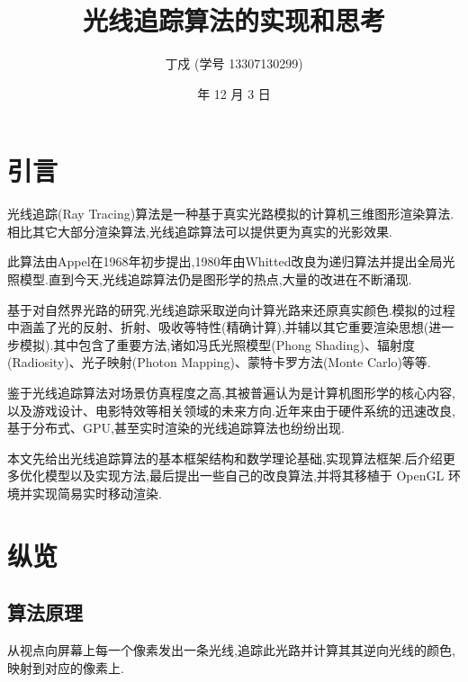 \documentclass[10pt,twocolumn]{article}
\begin{document}
\title{\hei 光线追踪算法的实现和思考}
\author{\fs 丁戍 \small{\fs (学号 13307130299)}}
\date{\small {} 年 12 月 3 日}

\section{\hei 引言}
光线追踪(Ray Tracing)算法是一种基于真实光路模拟的计算机三维图形渲染算法.相比其它大部分渲染算法,光线追踪算法可以提供更为真实的光影效果.

此算法由Appel在1968年初步提出,1980年由Whitted改良为递归算法并提出全局光照模型.直到今天,光线追踪算法仍是图形学的热点,大量的改进在不断涌现.

基于对自然界光路的研究,光线追踪采取逆向计算光路来还原真实颜色.模拟的过程中涵盖了光的反射、折射、吸收等特性(精确计算),并辅以其它重要渲染思想(进一步模拟).其中包含了重要方法,诸如冯氏光照模型(Phong Shading)、辐射度(Radiosity)、光子映射(Photon Mapping)、蒙特卡罗方法(Monte Carlo)等等.

鉴于光线追踪算法对场景仿真程度之高,其被普遍认为是计算机图形学的核心内容,以及游戏设计、电影特效等相关领域的未来方向.近年来由于硬件系统的迅速改良,基于分布式、GPU,甚至实时渲染的光线追踪算法也纷纷出现.

本文先给出光线追踪算法的基本框架结构和数学理论基础,实现算法框架.后介绍更多优化模型以及实现方法,最后提出一些自己的改良算法,并将其移植于 OpenGL 环境并实现简易实时移动渲染.

\section{\hei 纵览}
\subsection{\hei 算法原理}
从视点向屏幕上每一个像素发出一条光线,追踪此光路并计算其其逆向光线的颜色,映射到对应的像素上.
\end{document}
